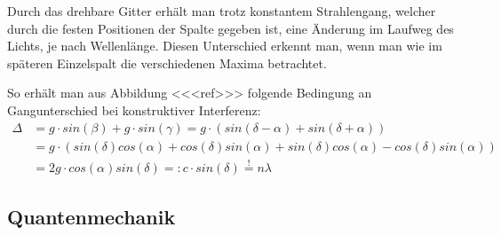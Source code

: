\documentclass[]{article}
\begin{document}
Durch das drehbare Gitter erhält man trotz konstantem Strahlengang, welcher durch die festen Positionen der Spalte gegeben ist, eine Änderung im Laufweg des Lichts, je nach Wellenlänge. Diesen Unterschied erkennt man, wenn man wie im späteren Einzelspalt die verschiedenen Maxima betrachtet. 

So erhält man aus Abbildung <<<ref>>> folgende Bedingung an Gangunterschied bei konstruktiver Interferenz:
\begin{align}
\Delta &= g\cdot sin(\beta) + g\cdot sin(\gamma) = g\cdot \left( sin(\delta - \alpha) + sin(\delta + \alpha)  \right) \\
 &= g\cdot ( sin(\delta)cos(\alpha) + cos(\delta)sin(\alpha) +  sin(\delta)cos(\alpha) - cos(\delta)sin(\alpha) ) \\
 &= 2g \cdot cos(\alpha) sin(\delta) =: c \cdot sin(\delta) \stackrel{!}{=} n\lambda 
\end{align}
 

\subsection{Quantenmechanik}
\end{document}
